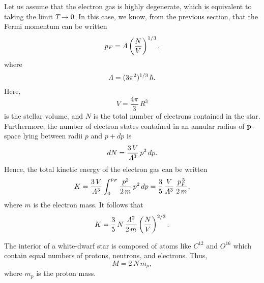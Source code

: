 Let us assume that the electron gas is highly degenerate, which is
equivalent to taking the limit $T\rightarrow 0$. In this case, we know,
from the previous section, that the Fermi momentum can be written
\begin{equation}
p_F = {\mit\Lambda}\left(\frac{N}{V}\right)^{1/3},
\end{equation}
where
\begin{equation}
{\mit\Lambda} = (3\pi^2)^{1/3}\,\hbar.\label{e8wd3}
\end{equation}
Here,
\begin{equation}
V = \frac{4\pi}{3}\,R^3\label{e8wd4}
\end{equation}
is the stellar volume, and $N$ is the total number of electrons contained
in the star. Furthermore, the number of
electron states contained in an annular radius of ${\bf p}$-space
lying between radii $p$ and $p+dp$ is
\begin{equation}
dN = \frac{3\,V}{{\mit\Lambda}^3}\, p^2\,dp.
\end{equation}
Hence, the total kinetic energy of the electron gas can be written
\begin{equation}
K = \frac{3\,V}{{\mit\Lambda}^3}\int_0^{p_F} \frac{p^2}{2\,m}\,p^2\,dp =
\frac{3}{5}\,\frac{V}{{\mit\Lambda}^3}\,\frac{p_F^{\,5}}{2\,m},\label{e8wdd}
\end{equation}
where $m$ is the electron mass. It follows that
\begin{equation}
K = \frac{3}{5}\,N\,\frac{{\mit\Lambda}^2}{2\,m}\left(\frac{N}{V}\right)^{2/3}.\label{e8wd5}
\end{equation}

The interior of a white-dwarf star is composed of atoms like
$C^{12}$ and $O^{16}$ which contain equal numbers of protons, neutrons, and
electrons. Thus,
\begin{equation}
M = 2\,N\,m_p,\label{e8wd6}
\end{equation}
where $m_p$ is the proton mass. 

